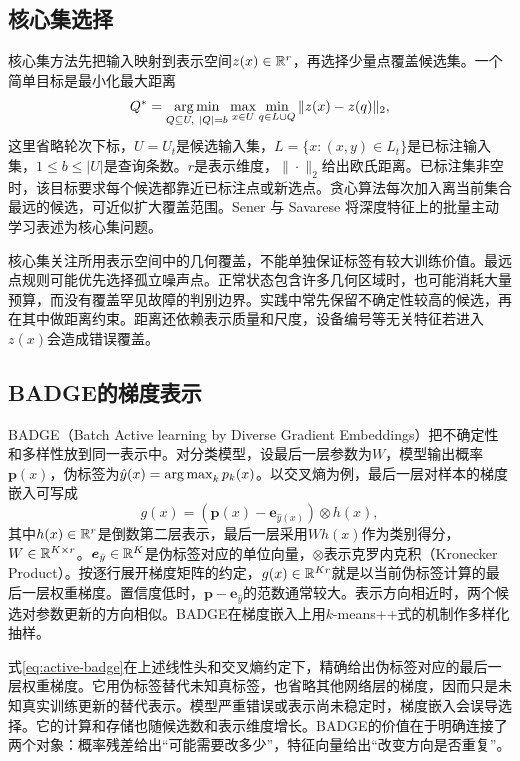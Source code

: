 \subsection{核心集选择}

核心集方法先把输入映射到表示空间$z(x)\in\mathbb{R}^r$，再选择少量点覆盖候选集。一个简单目标是最小化最大距离
\begin{equation}
 Q^*=\argmin_{Q\subseteq U,\ |Q|=b}\max_{x\in U}\min_{q\in L\cup Q}\|z(x)-z(q)\|_2,
 \label{eq:active-coreset}
\end{equation}
这里省略轮次下标，$U=U_t$是候选输入集，$L=\{x:(x,y)\in L_t\}$是已标注输入集，$1\leq b\leq|U|$是查询条数。$r$是表示维度，$\|\cdot\|_2$给出欧氏距离。已标注集非空时，该目标要求每个候选都靠近已标注点或新选点。贪心算法每次加入离当前集合最远的候选，可近似扩大覆盖范围。Sener 与 Savarese 将深度特征上的批量主动学习表述为核心集问题\cite{sener2018coreset}。

核心集关注所用表示空间中的几何覆盖，不能单独保证标签有较大训练价值。最远点规则可能优先选择孤立噪声点。正常状态包含许多几何区域时，也可能消耗大量预算，而没有覆盖罕见故障的判别边界。实践中常先保留不确定性较高的候选，再在其中做距离约束。距离还依赖表示质量和尺度，设备编号等无关特征若进入$z(x)$会造成错误覆盖。

\subsection{BADGE的梯度表示}

BADGE（Batch Active learning by Diverse Gradient Embeddings）把不确定性和多样性放到同一表示中。对分类模型，设最后一层参数为$W$，模型输出概率$\bm p(x)$，伪标签为$\hat y(x)=\mathop{\mathrm{arg\,max}}_kp_k(x)$。以交叉熵为例，最后一层对样本的梯度嵌入可写成
\begin{equation}
 g(x)=(\bm p(x)-\bm e_{\hat y(x)})\otimes h(x),
 \label{eq:active-badge}
\end{equation}
其中$h(x)\in\mathbb{R}^r$是倒数第二层表示，最后一层采用$Wh(x)$作为类别得分，$W\in\mathbb{R}^{K\times r}$。$\bm e_{\hat y}\in\mathbb{R}^K$是伪标签对应的单位向量，$\otimes$表示克罗内克积（Kronecker Product）。按逐行展开梯度矩阵的约定，$g(x)\in\mathbb{R}^{Kr}$就是以当前伪标签计算的最后一层权重梯度。置信度低时，$\bm p-\bm e_{\hat y}$的范数通常较大。表示方向相近时，两个候选对参数更新的方向相似。BADGE在梯度嵌入上用$k$-means++式的机制作多样化抽样\cite{ash2020badge}。

式\eqref{eq:active-badge}在上述线性头和交叉熵约定下，精确给出伪标签对应的最后一层权重梯度。它用伪标签替代未知真标签，也省略其他网络层的梯度，因而只是未知真实训练更新的替代表示。模型严重错误或表示尚未稳定时，梯度嵌入会误导选择。它的计算和存储也随候选数和表示维度增长。BADGE的价值在于明确连接了两个对象：概率残差给出“可能需要改多少”，特征向量给出“改变方向是否重复”。

